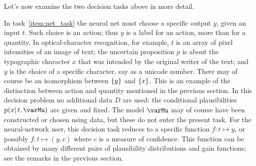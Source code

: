 \documentclass[\ifafour a4paper,12pt,\else a5paper,10pt,\fi%
onecolumn,oneside,article,%
british%
]{memoir}
\theoremstyle{remark}
\theoremstyle{innote}
\DeclarePairedDelimiter\set{\{}{\}}
\newcommand*{\pf}{\mathrm{p}}%
\renewcommand*{\|}{\mathpunct{|}}
\newcommand*{\yp}{p}
\newcommand*{\yD}{D}
\newcommand*{\yM}{\varMu}
\begin{document}
Let's now examine the two decision tasks above in more detail.

\smallskip

In task~\ref{item:net_task} the neural net must choose a specific output
$y$, given an input $t$. Such choice is an action; thus $y$ is a label for
an action, more than for a quantity. In optical-character recognition, for
example, $t$ is an array of pixel intensities of an image of text; the
uncertain proposition $\yp$ is about the typographic character $x$ that was
intended by the original writer of the text; and $y$ is the choice of a
specific character, say as a unicode number. There may of course be an
isomorphism between $\set{y}$ and $\set{x}$. This is an example of the
distinction between action and quantity mentioned in the previous section.
In this decision problem no additional data $\yD$ are used: the conditional
plausibilities $\pf(x \| t,\yM)$ are given and fixed. The model $\yM$ may
of course have been constructed or chosen using data, but these do not
enter the present task. For the neural-network user, this decision task
reduces to a specific function $f\colon t \mapsto y$, or possibly
$f\colon t \mapsto (y,c)$ where $c$ is a measure of confidence. This
function can be obtained by many different pairs of plausibility
distributions and gain functions; see the remarks in the previous section.

\smallskip
\end{document}
